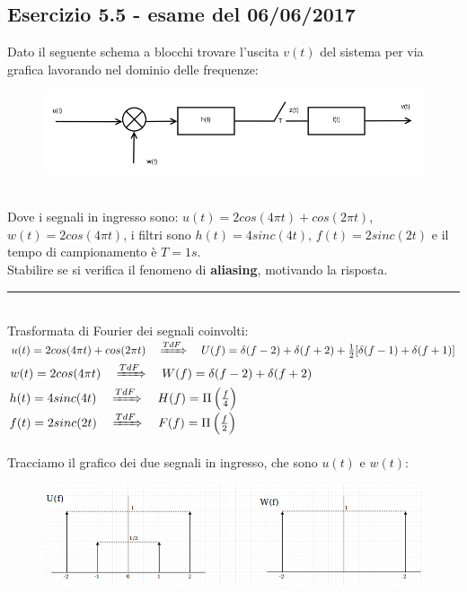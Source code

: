 \documentclass[12pt,a4paper]{article}
\begin{document}
	\subsection*{Esercizio 5.5 - esame del 06/06/2017} Dato il seguente schema a blocchi trovare l’uscita $v(t)$ del sistema per via grafica lavorando nel dominio delle frequenze:
	\begin{figure}[h!]
		\centering
		\includegraphics[scale=0.4]{./images/fourier55_1.png}
	\end{figure}
	\\Dove i segnali in ingresso sono: $u(t) = 2cos(4\pi t) + cos(2\pi t)$, $w(t) = 2cos(4\pi t)$, i filtri sono $h(t) = 4sinc(4t)$, $f(t) = 2 sinc(2t)$ e il tempo di campionamento è $T = 1s$.\\Stabilire se si verifica il fenomeno di \textbf{aliasing}, motivando la risposta.
	\vspace{5px}
	\par\noindent\rule{\textwidth}{0.4pt}
	\vspace{5px}
	\\
	Trasformata di Fourier dei segnali coinvolti:\vspace{5px}\\
	$u(t) = 2cos(4\pi t) + cos(2\pi t)\quad\xRightarrow[]{TdF}\quad U(f) = \delta(f-2) + \delta(f + 2) + \frac{1}{2}[\delta(f-1) + \delta(f+1)]$\\
	$w(t) = 2cos(4\pi t)\quad\xRightarrow[]{TdF}\quad W(f) = \delta(f-2) + \delta(f + 2)$\\
	$h(t) = 4sinc(4t)\quad\xRightarrow[]{TdF}\quad H(f) = \Pi\left(\frac{f}{4}\right)$\\
	$f(t) = 2sinc(2t) \quad\xRightarrow[]{TdF}\quad F(f) = \Pi\left(\frac{f}{2}\right)$\\ \\
	Tracciamo il grafico dei due segnali in ingresso, che sono $u(t)$ e $w(t)$:
	\begin{figure}[h!]
		\centering
		\includegraphics[scale=0.4]{./images/fourier55_2.png}
	\end{figure}
\end{document}

